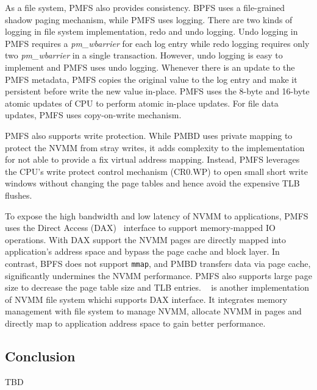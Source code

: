 As a file system, PMFS also provides consistency. BPFS uses a file-grained
shadow paging mechanism, while PMFS uses logging. There are two kinds of logging
in file system implementation, redo and undo logging. Undo logging in PMFS
requires a \emph{pm\_wbarrier} for each log entry while redo logging requires
only two \emph{pm\_wbarrier} in a single transaction. However, undo logging
is easy to implement and PMFS uses undo logging. Whenever there is an update
to the PMFS metadata, PMFS copies the original value to the log entry and
make it persistent before write the new value in-place. PMFS uses the
8-byte and 16-byte atomic updates of CPU to perform atomic in-place updates.
For file data updates, PMFS uses copy-on-write mechanism.

PMFS also supports write protection. While PMBD uses private mapping to
protect the NVMM from stray writes, it adds complexity to the implementation
for not able to provide a fix virtual address mapping. Instead, PMFS leverages
the CPU's write protect control mechanism (CR0.WP) to open small short write
windows without changing the page tables and hence avoid the expensive
TLB flushes.

To expose the high bandwidth and low latency of NVMM to applications,
PMFS uses the Direct Access (DAX)~\cite{ext4dax} interface to support
memory-mapped
IO operations. With DAX support the NVMM pages are directly mapped into
application's address space and bypass the page cache and block layer.
In contrast, BPFS does not support \texttt{mmap}, and PMBD transfers
data via page cache, significantly undermines the NVMM performance.
PMFS also supports large page size to decrease the page table size and
TLB entries. ~\cite{mmfs} is another implementation of NVMM file system
whichi supports DAX interface. It integrates memory management with file system
to manage NVMM, allocate NVMM in pages and directly map to application
address space to gain better performance.


\subsection{Conclusion} 
\label{sec:fs-conclude}

TBD
